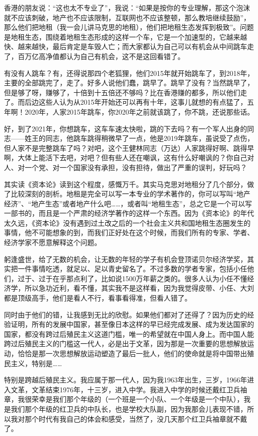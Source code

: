\documentclass[UTF8, 12pt, a4paper]{ctexrep}
\begin{document}
香港的朋友说：“这也太不专业了”，我说：“如果是按你的专业理解，那这个泡沫就不应该刺破，地产也不应该限制，互联网也不应该整顿，那么教培继续鼓励”，那么他们把地租（我一会儿讲马克思的地租），他们把地租生态发挥到极致”。问题是地租生态，围绕着地租生态形成的这样一个车，它是一个加速型的，它越来越快、越来越快，最后肯定是车毁人亡；而大家都认为自己可以有机会从中间跳车走了，百万亿高净值都认为自己有机会，这不是这回看错了。

有没有人跳车？有，还得说那四个老狐狸，他们2015年就开始跳车了，到2018年，主要的全部跳完了，走了。好多人说他们蠢，跳早了。跳早了没有？当然跳早了，但是够了呀，赚够了，十倍到十五倍还不够吗？比在香港赚的都多，所以他们走了。而后边这些人认为从2015年开始还可以再有十年，这事儿就想的有点猛了，五年啊！2020年，人家2015年跳车，你2020年之前就该跳了，你不跳，还说那些话。

好，到了2021年，你想跳车，这车车速太快啦，跳的下去吗？有一个军人出身的同志——姓王的同志，他跳车跳得稍微早了一点，他是2019年跳车，虽说受了点伤，但人家不是完整跳车了吗？对吧，这个王健林同志（万达）人家跳得好啊、跳得早啊，大体上能活下去吧，对吧？但有些人还在嘲讽，这有什么好嘲讽的？你自己对人、对一个党、对一个国家没有承担，没有担待，做出了严重的误判，好玩吗？

其实读《资本论》读到这个程度，感慨万千。其实马克思对地租分了几个部分，做了比较深刻的剖析。地租是完全可以写一本专业的学术著作的，你可以写叫“地产经济”、“地产生态”或者地产什么吧……，或者叫“地租生态”，总之它是一个可以写一部书的，而且是一个严肃的经济学著作的这样一个东西。因为《资本论》的年代太久远，《资本论》没有遇到过土改之后的一个社会主义共和国地租生态圈发生的事情，他不可能想象的到，而我们正好处在这个时候，而我们所有的专家、学者、经济学家不愿意解释这个问题。

躬逢盛世，给了无数的机会，让无数的年轻的学子有机会登顶诺贝尔经济学奖，其实把一件事情吃透，就足以、足以青史留名了。不过多数的学者专家，包括小任他们，过于、过于在乎那点利了，比如说1500万年薪之类的。很多人认为小任不懂经济学，所以急功近利，看不懂，其实我不是这样看，因为我觉得皮带、小任、大刘都是顶级高手，他们是看人不行，看事看得准，但看人错了。

同时由于他们的错，让我感到无比的欣慰。如果他们都对了还得了？因为历史的经验证明，所有的发展中国家，甚至像日本这样的早已经完成发展、成为发达国家的国家，都没有跨过后殖民主义这道门槛，唯一的希望就在中国人身上。而中国人能跨过后殖民主义的门槛这一代人，必是出于文革，因为那是一次重要的思想解放运动，恰恰是那一次思想解放运动塑造了最后一批人，他们的使命就是将中国带出殖民主义，特别是……

特别是跨越后殖民主义。我应属于那一代人，因为我1963年出生，三岁，1966年进入文革，文革结束1976年，十三岁，进入中学。我进入中学的时候还戴红卫兵袖章，我很荣幸是我们那个年级的（一个班是一个小队、一个年级是一个中队），我是我们那个年级的红卫兵的中队长，也是学校大队副，因为我那会儿表现不错，所以我对那个时代有我自己的体会和感受，当然了，没几天那个红卫兵袖章就不戴了。
\end{document}
